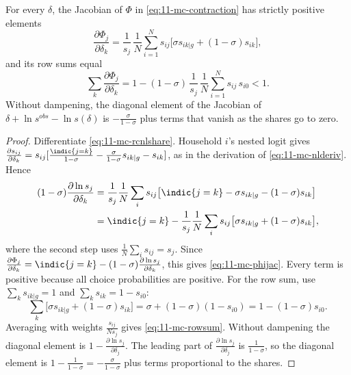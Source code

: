 \begin{proposition}\label{prop:11-mc-contraction}
For every $\delta$, the Jacobian of $\Phi$ in \eqref{eq:11-mc-contraction} has strictly positive elements
\begin{equation}\label{eq:11-mc-phijac}
  \frac{\partial \Phi_j}{\partial \delta_k} = \frac{1}{s_j}\,\frac{1}{N}\sum_{i=1}^{N}s_{ij}\big[\sigma s_{ik|g} +
  (1-\sigma)s_{ik}\big],
\end{equation}
and its row sums equal
\begin{equation}\label{eq:11-mc-rowsum}
  \sum_{k}\frac{\partial \Phi_j}{\partial \delta_k} = 1 - (1-\sigma)\,\frac{1}{s_j}\,\frac{1}{N}\sum_{i=1}^{N}s_{ij}\,s_{i0} < 1 .
\end{equation}
Without dampening, the diagonal element of the Jacobian of $\delta + \ln s^{obs} - \ln s(\delta)$ is
$-\frac{\sigma}{1-\sigma}$ plus terms that vanish as the shares go to zero.
\end{proposition}

\begin{proof}
Differentiate \eqref{eq:11-mc-rcnlshare}. Household $i$'s nested logit gives
$\frac{\partial s_{ij}}{\partial \delta_k} = s_{ij}[\frac{\indic\{j=k\}}{1-\sigma} - \frac{\sigma}{1-\sigma}s_{ik|g}
- s_{ik}]$, as in the derivation of \eqref{eq:11-mc-nlderiv}. Hence
\begin{align*}
  (1-\sigma)\frac{\partial \ln s_j}{\partial \delta_k}
  &= \frac{1}{s_j}\frac{1}{N}\sum_i s_{ij}\big[\indic\{j=k\} - \sigma s_{ik|g} - (1-\sigma)s_{ik}\big] \\
  &= \indic\{j=k\} - \frac{1}{s_j}\frac{1}{N}\sum_i s_{ij}\big[\sigma s_{ik|g} + (1-\sigma)s_{ik}\big],
\end{align*}
where the second step uses $\frac{1}{N}\sum_i s_{ij} = s_j$. Since $\frac{\partial\Phi_j}{\partial\delta_k} =
\indic\{j=k\} - (1-\sigma)\frac{\partial\ln s_j}{\partial\delta_k}$, this gives \eqref{eq:11-mc-phijac}. Every term
is positive because all choice probabilities are positive. For the row sum, use $\sum_k s_{ik|g} = 1$ and $\sum_k
s_{ik} = 1 - s_{i0}$:
\begin{equation*}
  \sum_k\big[\sigma s_{ik|g} + (1-\sigma)s_{ik}\big] = \sigma + (1-\sigma)(1 - s_{i0}) = 1 - (1-\sigma)s_{i0}.
\end{equation*}
Averaging with weights $\frac{s_{ij}}{N s_j}$ gives \eqref{eq:11-mc-rowsum}. Without dampening the diagonal element is
$1 - \frac{\partial\ln s_j}{\partial\delta_j}$. The leading part of $\frac{\partial \ln s_j}{\partial\delta_j}$ is
$\frac{1}{1-\sigma}$, so the diagonal element is $1 - \frac{1}{1-\sigma} = -\frac{\sigma}{1-\sigma}$ plus terms
proportional to the shares.
\end{proof}

